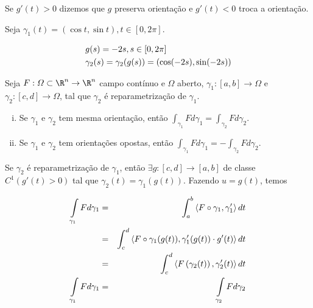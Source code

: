 \documentclass[11pt, oneside, a4paper]{gsm-l}
\begin{document}
Se $g'(t) > 0$ dizemos que $g$ preserva orientação e $g'(t) < 0$ troca a orientação.

\begin{exem}
Seja $\gamma_1 (t) = (\cos t, \sin t), t \in [0,2\pi]$.

\[
\begin{gathered}
  g(s) =  - 2s,s \in [0,2\pi ] \hfill \\
  \gamma _2 (s) = \gamma _2 (g(s)) = \left( {\cos ( - 2s),\sin ( - 2s)} \right) \hfill \\ 
\end{gathered} 
\]
\end{exem}

\begin{teo}
Seja $F:\varOmega \subset \R^n \to \R^n$ campo contínuo e $\varOmega$ aberto, $\gamma_1: [a,b] \to \varOmega$ e $\gamma_2: [c,d] \to \varOmega$, tal que $\gamma_2$ é reparametrização de $\gamma_1$.

\begin{enumerate}[(i)]
 \item Se $\gamma_1$ e $\gamma_2$ tem mesma orientação, então $\int_{\gamma _1 } {Fd\gamma _1 }  = \int_{\gamma _2 } {Fd\gamma _2 }$.
 \item Se $\gamma_1$ e $\gamma_2$ tem orientações opostas, então $\int_{\gamma _1 } {Fd\gamma _1 }  = -\int_{\gamma _2 } {Fd\gamma _2 }$.
\end{enumerate}

\end{teo}

\begin{dem}
Se $\gamma_2$ é reparametrização de $\gamma_1$, então $\exists g: [c,d] \to [a,b]$ de classe $C^1 (g'(t) > 0)$ tal que $\gamma_2 (t) = \gamma_1 (g(t))$. Fazendo $u = g(t)$, temos

\begin{eqnarray*}
\int\limits_{\gamma _1 } {Fd\gamma _1 } &=& \int_a^b {\left\langle {F \circ \gamma _1 ,\gamma _1 '} \right\rangle dt}  \hfill \\
&=& \int_c^d {\left\langle {F \circ \gamma _1 (g(t)),\gamma _1 '(g(t)) \cdot g'(t)} \right\rangle dt}  \hfill \\
&=& \int_c^d {\left\langle {F\left( {\gamma _2 (t)} \right),\gamma _2 '(t)} \right\rangle dt}  \hfill \\
\int\limits_{\gamma _1 } {Fd\gamma _1 } &=& \int\limits_{\gamma _2 } {Fd\gamma _2 }  \hfill \\ 
\end{eqnarray*}

\end{dem}
\end{document}
